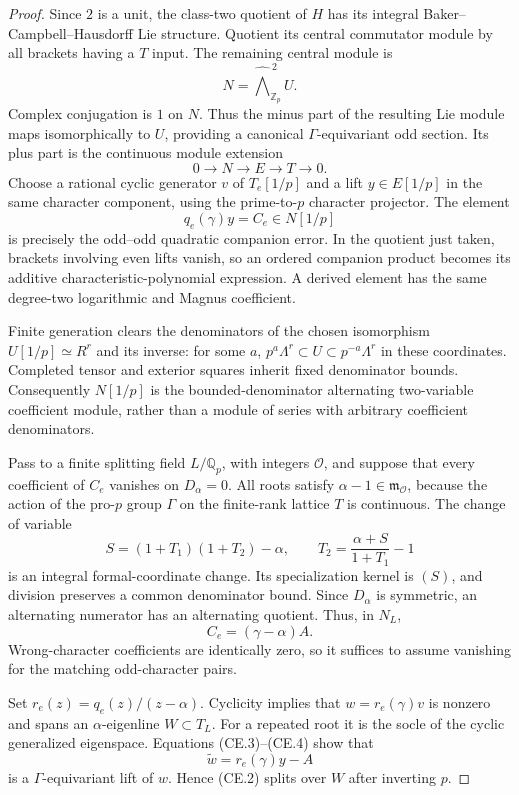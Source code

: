 \begin{proof}
Since $2$ is a unit, the class-two quotient of $H$ has its integral
Baker--Campbell--Hausdorff Lie structure. Quotient its central
commutator module by all brackets having a $T$ input. The remaining
central module is
\[
 N=\widehat{\bigwedge}^{\,2}_{\mathbb Z_p}U.
\]
Complex conjugation is $1$ on $N$. Thus the minus part of the
resulting Lie module maps isomorphically to $U$, providing a
canonical $\Gamma$-equivariant odd section. Its plus part is the
continuous module extension
\[
 0\longrightarrow N\longrightarrow E\longrightarrow T
 \longrightarrow0.                                          \tag{CE.2}
\]
Choose a rational cyclic generator $v$ of $T_e[1/p]$ and a lift
$y\in E[1/p]$ in the same character component, using the
prime-to-$p$ character projector. The element
\[
 q_e(\gamma)y=C_e\in N[1/p]                                 \tag{CE.3}
\]
is precisely the odd--odd quadratic companion error. In the quotient
just taken, brackets involving even lifts vanish, so an ordered
companion product becomes its additive characteristic-polynomial
expression. A derived element has the same degree-two logarithmic
and Magnus coefficient.

Finite generation clears the denominators of the chosen isomorphism
$U[1/p]\simeq R^r$ and its inverse: for some $a$,
$p^a\Lambda^r\subset U\subset p^{-a}\Lambda^r$ in these
coordinates. Completed tensor and exterior squares inherit fixed
denominator bounds. Consequently $N[1/p]$ is the bounded-denominator
alternating two-variable coefficient module, rather than a module of
series with arbitrary coefficient denominators.

Pass to a finite splitting field $L/\mathbb Q_p$, with integers
$\mathcal O$, and suppose that every coefficient of $C_e$ vanishes
on $D_\alpha=0$. All roots satisfy $\alpha-1\in\mathfrak m_{\mathcal O}$,
because the action of the pro-$p$ group $\Gamma$ on the finite-rank
lattice $T$ is continuous. The change of variable
\[
 S=(1+T_1)(1+T_2)-\alpha,\qquad
 T_2=\frac{\alpha+S}{1+T_1}-1
\]
is an integral formal-coordinate change. Its specialization kernel
is $(S)$, and division preserves a common denominator bound.
Since $D_\alpha$ is symmetric, an alternating numerator has an
alternating quotient. Thus, in $N_L$,
\[
 C_e=(\gamma-\alpha)A.                                      \tag{CE.4}
\]
Wrong-character coefficients are identically zero, so it suffices
to assume vanishing for the matching odd-character pairs.

Set $r_e(z)=q_e(z)/(z-\alpha)$. Cyclicity implies that
$w=r_e(\gamma)v$ is nonzero and spans an $\alpha$-eigenline
$W\subset T_L$. For a repeated root it is the socle of the cyclic
generalized eigenspace. Equations (CE.3)--(CE.4) show that
\[
 \widetilde w=r_e(\gamma)y-A
\]
is a $\Gamma$-equivariant lift of $w$. Hence (CE.2) splits over
$W$ after inverting $p$.


\end{proof}
